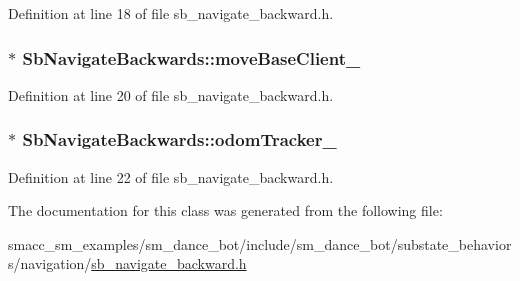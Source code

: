 Definition at line 18 of file sb\+\_\+navigate\+\_\+backward.\+h.

\subsubsection[{\texorpdfstring{move\+Base\+Client\+\_\+}{moveBaseClient_}}]{$\ast$ Sb\+Navigate\+Backwards\+::move\+Base\+Client\+\_\+}\hypertarget{classSbNavigateBackwards_a7e46b20eb07e60685a5b88b12b341fd8}{}\label{classSbNavigateBackwards_a7e46b20eb07e60685a5b88b12b341fd8}


Definition at line 20 of file sb\+\_\+navigate\+\_\+backward.\+h.

\subsubsection[{\texorpdfstring{odom\+Tracker\+\_\+}{odomTracker_}}]{$\ast$ Sb\+Navigate\+Backwards\+::odom\+Tracker\+\_\+}\hypertarget{classSbNavigateBackwards_a570fa48348a172b3db7bcb5f486017b1}{}\label{classSbNavigateBackwards_a570fa48348a172b3db7bcb5f486017b1}


Definition at line 22 of file sb\+\_\+navigate\+\_\+backward.\+h.



The documentation for this class was generated from the following file\+:\begin{DoxyCompactItemize}
\item 
smacc\+\_\+sm\+\_\+examples/sm\+\_\+dance\+\_\+bot/include/sm\+\_\+dance\+\_\+bot/substate\+\_\+behaviors/navigation/\hyperlink{sb__navigate__backward_8h}{sb\+\_\+navigate\+\_\+backward.\+h}\end{DoxyCompactItemize}
